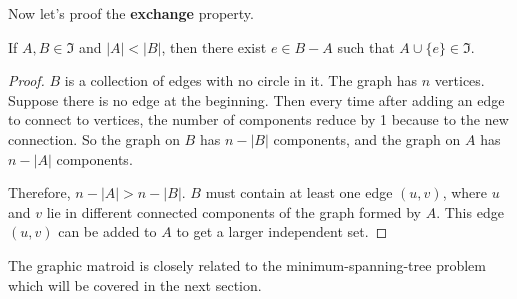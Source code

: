Now let's proof the \textbf{exchange} property. 

\begin{lemma}
	If $ A, B \in \mathfrak{I} $ and $ |A| < |B| $, then there exist $ e \in B - A $ such that $ A \cup \{e\} \in \mathfrak{I}$.
\end{lemma}

\begin{proof}
	$B$ is a collection of edges with no circle in it. The graph has $n$ vertices. Suppose there is no edge at the beginning. Then every time after adding an edge to connect to vertices, the number of components reduce by 1 because to the new connection. So the graph on $B$ has $ n - |B| $ components, and the graph on $A$ has $ n - |A| $ components. 
	
	Therefore, $ n - |A| > n - |B| $. $B$ must contain at least one edge $ (u, v) $, where $u$ and $v$ lie in different connected components of the graph formed by $A$. This edge $ (u, v) $ can be added to $A$ to get a larger independent set.
\end{proof}

The graphic matroid is closely related to the minimum-spanning-tree problem which will be covered in the next section.